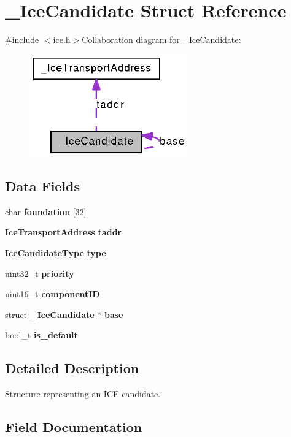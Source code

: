 \section{\_\-IceCandidate Struct Reference}
\label{struct__IceCandidate}


{\ttfamily \#include $<$ice.h$>$}Collaboration diagram for \_\-IceCandidate:\nopagebreak
\begin{figure}[H]
\begin{center}
\leavevmode
\includegraphics[width=193pt]{struct__IceCandidate__coll__graph}
\end{center}
\end{figure}
\subsection*{Data Fields}
\begin{DoxyCompactItemize}
\item 
char {\bf foundation} [32]
\item 
{\bf IceTransportAddress} {\bf taddr}
\item 
{\bf IceCandidateType} {\bf type}
\item 
uint32\_\-t {\bf priority}
\item 
uint16\_\-t {\bf componentID}
\item 
struct {\bf \_\-IceCandidate} $\ast$ {\bf base}
\item 
bool\_\-t {\bf is\_\-default}
\end{DoxyCompactItemize}


\subsection{Detailed Description}
Structure representing an ICE candidate. 

\subsection{Field Documentation}
